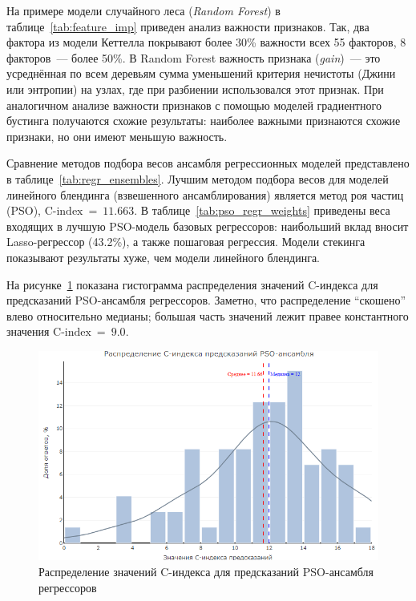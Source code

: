 На примере модели случайного леса (\emph{Random Forest}) в таблице~\ref{tab:feature_imp} приведен анализ важности признаков. Так, два фактора из модели Кеттелла покрывают более 30\% важности всех 55 факторов, 8 факторов~--- более 50\%. В Random Forest важность признака (\emph{gain})~--- это усреднённая по всем деревьям сумма уменьшений критерия нечистоты (Джини или энтропии) на узлах, где при разбиении использовался этот признак. При аналогичном анализе важности признаков с помощью моделей градиентного бустинга получаются схожие результаты: наиболее важными признаются схожие признаки, но они имеют меньшую важность.



Сравнение методов подбора весов ансамбля регрессионных моделей представлено в таблице~\ref{tab:regr_ensembles}. Лучшим методом подбора весов для моделей линейного блендинга (взвешенного ансамблирования) является метод роя частиц (PSO), $\text{C‑index}~=~11.663$. В таблице~\ref{tab:pso_regr_weights} приведены веса входящих в лучшую PSO-модель базовых регрессоров: наибольший вклад вносит Lasso-регрессор (43.2\%), а также пошаговая регрессия. Модели стекинга показывают результаты хуже, чем модели линейного блендинга.



На рисунке~\ref{fig:cindex_distr} показана гистограмма распределения значений C-индекса для предсказаний PSO-ансамбля регрессоров. Заметно, что распределение \enquote{скошено} влево относительно медианы; большая часть значений лежит правее константного значения $\text{C‑index}~=~9.0$.



\begin{figure}[htbp]
    \centering
    \includegraphics[width=0.95\linewidth]{figures/Cindex_distr_PSO_regr.png}
    \caption{Распределение значений C-индекса для предсказаний PSO-ансамбля регрессоров}
    \label{fig:cindex_distr}
\end{figure}

